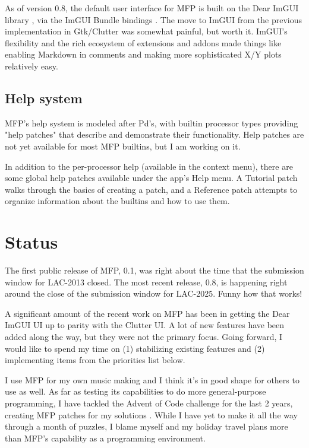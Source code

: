 \documentclass[a4paper]{article}
\def\:{\hskip0pt}
\begin{document}
As of version 0.8, the default user interface for MFP is built on
the Dear ImGUI library \cite{DearImGUI}, via the ImGUI Bundle
bindings \cite{ImguiBundle}. The move to ImGUI from the previous
implementation in Gtk/Clutter was somewhat painful, but worth it.
ImGUI's flexibility and the rich ecosystem of extensions and
addons made things like enabling Markdown in comments and making
more sophisticated X/Y plots relatively easy.

\subsection{Help system}

MFP's help system is modeled after Pd's, with builtin processor
types providing "help patches" that describe and demonstrate
their functionality. Help patches are not yet available for most
MFP builtins, but I am working on it.

In addition to the per-processor help (available in the context menu),
there are some global help patches available under the app's Help menu.
A Tutorial patch walks through the basics of creating a patch, and
a Reference patch attempts to organize information about the
builtins and how to use them.

\section{Status}

The first public release of MFP, 0.1, was right about the time that the
submission window for LAC-2013 closed. The most recent release,
0.8, is happening right around the close of the submission window
for LAC-2025. Funny how that works!

A significant amount of the recent work on MFP has been in
getting the Dear ImGUI UI up to parity with the Clutter UI. A lot
of new features have been added along the way, but they were not
the primary focus. Going forward, I would like to spend my time
on (1) stabilizing existing features and (2) implementing items
from the priorities list below.

I use MFP for my own music making and I think it's in good shape
for others to use as well. As far as testing its capabilities to
do more general\:-\:purpose programming, I have tackled the
Advent of Code \cite{AdventOfCode} challenge for the last 2
years, creating MFP patches for my solutions
\cite{Gribble:Advent}. While I have yet to make it all the way
through a month of puzzles, I blame myself and my holiday travel
plans more than MFP's capability as a programming environment.
\end{document}

